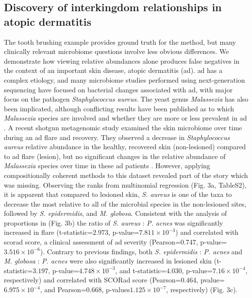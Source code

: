 \subsection{Discovery of interkingdom relationships in atopic dermatitis}
The tooth brushing example provides ground truth for the method, but many clinically relevant microbiome questions
involve less obvious differences. We demonstrate how viewing relative abundances alone produces false negatives in
the context of an important skin disease, atopic dermatitis (\gls{ad}). \gls{ad} has a complex etiology, and many microbiome
studies performed using next-generation sequencing have focused on bacterial changes associated with \gls{ad}, with major
focus on the pathogen \textit{Staphylococcus aureus}. The yeast genus \textit{Malassezia} has also been implicated, although conflicting
results have been published as to which \textit{Malassezia} species are involved and whether they are more or less prevalent
in \gls{ad} \cite{Glatz2015-ag}. A recent shotgun metagenomic study examined the skin microbiome over time during an \gls{ad}
flare and recovery. They observed a decrease in \textit{Staphylococcus aureus} relative abundance in the healthy, recovered
skin (non-lesioned) compared to \gls{ad} flare (lesion), but no significant changes in the relative abundance of
\textit{Malassezia} species over time in these \gls{ad} patients \cite{Byrd2017-eb}.
%
However, applying compositionally coherent methods to this dataset revealed part of the story which was missing.
Observing the ranks from multinomial regression (Fig. 3a, TableS2), it is apparent that compared to lesioned skin,
\textit{S. aureus} is one of the taxa to decrease the most relative to all of the microbial species in the non-lesioned sites,
followed by \textit{S. epidermidis}, and \textit{M. globosa}. Consistent with the analysis of proportions
in (Fig. 3b) the ratio of \textit{S. aureus} : \textit{P. acnes} was significantly increased in flare
(t-statistic=$2.973$, p-value=$7.811 \times 10^{-3}$) and correlated with \gls{scorad} score, a clinical assessment
of \gls{ad} severity (Pearson=0.747, p-value=$3.516 \times 10^{-6}$). Contrary to previous findings, both
\textit{S. epidermidis} : \textit{P. acnes} and \textit{M. globosa} : \textit{P. acnes} were also significantly
increased in lesioned skin (t-statistic=$3.197$, p-value=$4.748 \times 10^{-3}$, and t-statistic=$4.030$,
p-value=$7.16 \times 10^{-4}$, respectively) and correlated with SCOR\gls{ad} score (Pearson=0.464,
pvalue=$6.975 \times 10^{-4}$, and Pearson=$0.668$, p-values$1.125 \times 10^{-7}$, respectively) (Fig. 3c). \\[5 mm]
